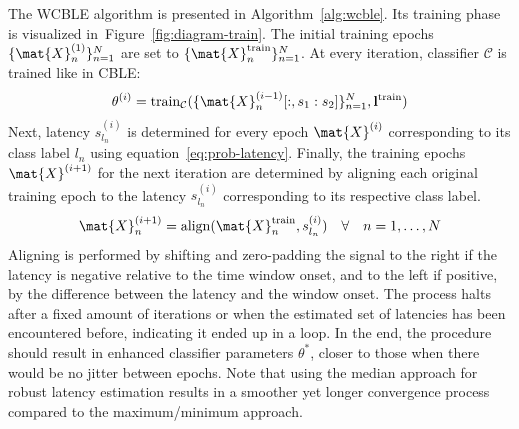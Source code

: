 The WCBLE algorithm is presented in Algorithm~\ref{alg:wcble}.
Its training phase is visualized in~Figure~\ref{fig:diagram-train}.
The initial training epochs $\{\mat{X}_n^{(1)}\}_{n=1}^N$ are set to $\{\mat{X}_n^\mathrm{train}\}_{n=1}^N$.
At every iteration, classifier $\mathcal{C}$ is trained like in CBLE:
\begin{equation}
  \theta^{(i)} =
  \mathrm{train}_\mathcal{C}(\{\mat{X}^{(i-1)}_n[:,s_1:s_2]\}_{n=1}^N,\mathbf{l}^\mathrm{train})
\end{equation}
Next, latency $s_{l_n}^{(i)}$ is determined for every epoch $\mat{X}^{(i)}$ corresponding
to its class label $l_n$ using equation~\ref{eq:prob-latency}.
Finally, the training epochs $\mat{X}^{(i+1)}$ for the next iteration are determined by aligning
each original training epoch to the latency $s_{l_n}^{(i)}$ corresponding to its respective class
label.
\begin{equation}
  \mat{X}^{(i+1)}_n = \mathrm{align}(\mat{X}_n^\mathrm{train}, s_{l_n}^{(i)}) \quad \forall \quad n=1,\ldots,N
\end{equation}
Aligning is performed by shifting and zero-padding the signal to the right if
the latency is negative relative to the time window onset, and to the left if
positive, by the difference between the latency and the window onset.
The process halts after a fixed amount of iterations or when the estimated set
of latencies has been encountered before, indicating it ended up in a loop.
In the end, the procedure should result in enhanced classifier parameters $\theta^*$,
closer to those when there would be no jitter between epochs.
Note that using the median approach for robust latency estimation results in a
smoother yet longer convergence process compared to the maximum/minimum approach.
